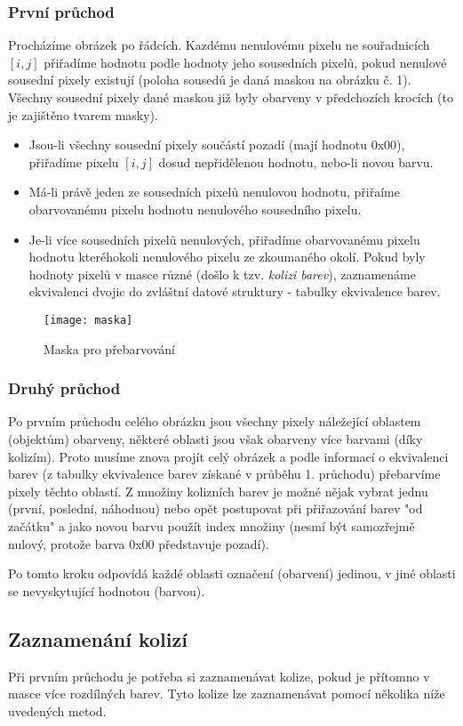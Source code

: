 \documentclass[12pt, a4paper]{article}
\begin{document}
\subsubsection{První průchod}
Procházíme obrázek po řádcích. Kazdému nenulovému pixelu ne souřadnicích $[i,j]$ přiřadíme hodnotu podle hodnoty jeho sousedních pixelů, pokud nenulové sousední pixely existují (poloha sousedů je daná maskou na obrázku č. 1). Všechny sousední pixely dané maskou již byly obarveny v předchozích krocích (to je zajištěno tvarem masky).
\begin{itemize}
  \item Jsou-li všechny sousední pixely součástí pozadí (mají hodnotu 0x00), přiřadíme pixelu $[i, j]$ dosud nepřidělenou hodnotu, nebo-li novou barvu.
  \item Má-li právě jeden ze sousedních pixelů nenulovou hodnotu, přiřaíme obarvovanému pixelu hodnotu nenulového sousedního pixelu.
  \item Je-li více sousedních pixelů nenulových, přiřadíme obarvovanému pixelu hodnotu kteréhokoli nenulového pixelu ze zkoumaného okolí. Pokud byly hodnoty pixelů v masce různé (došlo k tzv. {\it kolizi barev}), zaznamenáme ekvivalenci dvojic do zvláštní datové struktury - tabulky ekvivalence barev.
\end{itemize}
\begin{figure}[h]
\centering 
\texttt{[image: maska]}
\caption{Maska pro přebarvování}
\end{figure}

\subsubsection{Druhý průchod}
Po prvním průchodu celého obrázku jsou všechny pixely náležející oblastem (objektům) obarveny, některé oblasti jsou však obarveny více barvami (díky kolizím). Proto musíme znova projít celý obrázek a podle informací o ekvivalenci barev (z tabulky ekvivalence barev získané v průběhu 1. průchodu) přebarvíme pixely těchto oblastí. Z množiny kolizních barev je možné nějak vybrat jednu (první, poslední, náhodnou) nebo opět postupovat při přiřazování barev "od začátku" a jako novou barvu použít index množiny (nesmí být samozřejmě nulový, protože barva 0x00 představuje pozadí).

Po tomto kroku odpovídá každé oblasti označení (obarvení) jedinou, v jiné oblasti se nevyskytující hodnotou (barvou).

\subsection{Zaznamenání kolizí}
Při prvním průchodu je potřeba si zaznamenávat kolize, pokud je přítomno v masce více rozdílných barev. Tyto kolize lze zaznamenávat pomocí několika níže uvedených metod.
\end{document}
